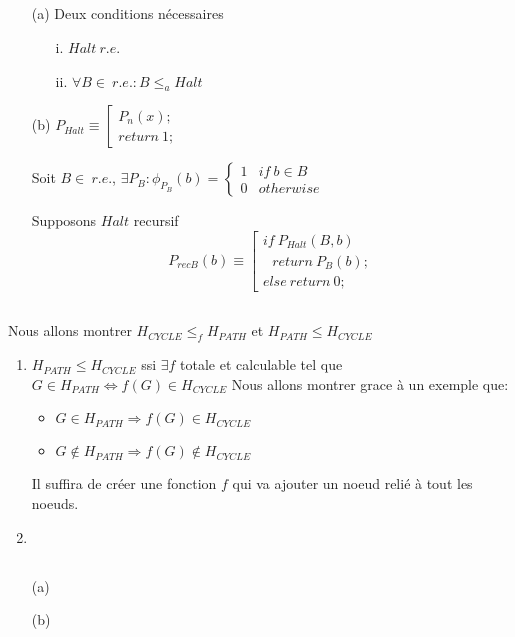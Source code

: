 \subsection{}
\begin{itemize}
	\item[(a)] Deux conditions nécessaires
		\begin{itemize}
			\item[i.] $Halt \ r.e.$
			\item[ii.] $\forall B \in \ r.e. : B \leq_a Halt$
		\end{itemize}
	\item[(b)] $P_{Halt} \equiv \left[ \begin{array}{l}P_n(x);\\return\ 1; \end{array} \right.$

Soit $B \in \ r.e.$, $\exists P_B : \phi_{P_B}(b) = 
\left\{
\begin{array}{ll}
	1 & if \ b \in B \\ 
	0 & otherwise
\end{array}
\right.$

Supposons $Halt$ recursif
$$P_{recB}(b) \equiv 
\left[
\begin{array}{l}
if\ P_{Halt}(B,b)\\
\ \ \ return \ P_B(b);\\
else\ return \ 0;
\end{array}
\right.
$$
\end{itemize}

\subsection{}

Nous allons montrer $H_{CYCLE} \leq_f H_{PATH}$ et $H_{PATH} \leq H_{CYCLE}$
\begin{enumerate}
	\item $H_{PATH} \leq H_{CYCLE}$ ssi $\exists f$ totale et calculable tel que $G \in H_{PATH} \Leftrightarrow f(G) \in H_{CYCLE}$ Nous allons montrer grace à un exemple que:
	\begin{itemize}
		\item $G \in H_{PATH} \Rightarrow f(G) \in H_{CYCLE}$
		\item $G \notin H_{PATH} \Rightarrow f(G) \notin H_{CYCLE}$
	\end{itemize}
	Il suffira de créer une fonction $f$ qui va ajouter un noeud relié à tout les noeuds.
	\item
\end{enumerate}

\subsection{}

\begin{itemize}
	\item[(a)]
	\item[(b)]
\end{itemize}